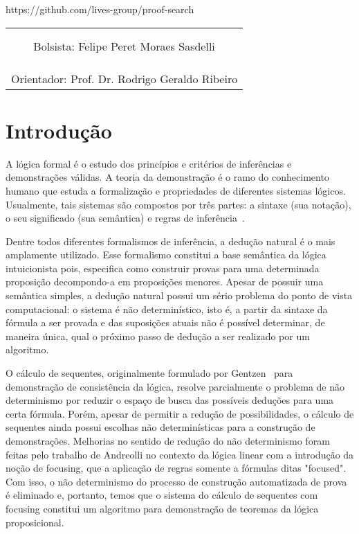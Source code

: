 \documentclass[paper=a4, fontsize=12pt]{article}
\theoremstyle{definition}
\begin{document}
\begin{center}
https://github.com/lives-group/proof-search
\end{center}
\vspace{2cm}
\begin{center}
\begin{tabular}{c}
$\,$  \\
$\,$  \\
\hline
Bolsista: Felipe Peret Moraes Sasdelli\\
$\,$  \\
$\,$  \\
$\,$  \\ \hline
Orientador: Prof. Dr. Rodrigo Geraldo Ribeiro
\end{tabular}
\end{center}



\clearpage

\section{Introdução}

A lógica formal é o estudo dos princípios e critérios de inferências e
demonstrações válidas. A teoria da demonstração é o ramo do conhecimento humano
que estuda a formalização e propriedades de diferentes sistemas lógicos. Usualmente,
tais sistemas são compostos por três partes: a sintaxe (sua notação),
o seu significado (sua semântica) e regras de inferência~\cite{Negri2001}.

Dentre todos diferentes formalismos de inferência, a dedução natural é o mais
amplamente utilizado. Esse formalismo constitui a base semântica da lógica intuicionista
pois, especifica como construir provas para uma determinada proposição decompondo-a em
proposições menores. Apesar de possuir uma semântica simples, a dedução natural possui
um sério problema do ponto de vista computacional: o sistema é não determinístico, isto é,
a partir da sintaxe da fórmula a ser provada e das suposições atuais não é possível determinar,
de maneira única, qual o próximo passo de dedução a ser realizado por um algoritmo.

O cálculo de sequentes, originalmente formulado por Gentzen~\cite{Gentzen36} para demonstração de
consistência da lógica, resolve parcialmente o problema de não determinismo por reduzir o
espaço de busca das possíveis deduções para uma certa fórmula. Porém, apesar de permitir a redução
de possibilidades, o cálculo de sequentes ainda possui escolhas não determinísticas
para a construção de demonstrações. Melhorias no sentido de redução do não determinismo foram feitas
pelo trabalho de Andreolli no contexto da lógica linear com a introdução da noção de focusing, que
a aplicação de regras somente a fórmulas ditas "focused". Com isso, o não determinismo do processo
de construção automatizada de prova é eliminado e, portanto, temos que o sistema do cálculo de sequentes
com focusing constitui um algoritmo para demonstração de teoremas da lógica proposicional.
\end{document}
